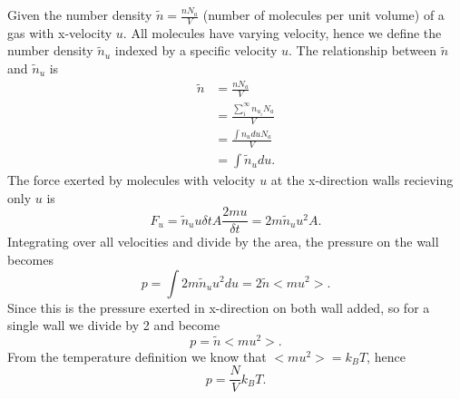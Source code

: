 \begin{derv*} 
Given the number density $\tilde{n} = \frac{n N_a}{V}$ (number of molecules per
unit volume) of a gas with x-velocity $u$. All molecules have varying velocity, hence we define the
number density $\tilde{n}_u$ indexed by a specific velocity $u$. The relationship between
$\tilde{n}$ and $\tilde{n}_u$ is
\begin{equation}
\begin{aligned}
   \tilde{n} & = \frac{n N_a}{V} \\
             & = \frac{\sum_{i}^\infty n_{u_i} N_a}{V} \\
             & = \frac{\int n_{u} du N_a}{V} \\
             & = \int \tilde{n}_u du.
\end{aligned}
\end{equation}
The force exerted by molecules with velocity $u$ at the x-direction walls recieving only $u$ is
\begin{equation}
   F_u = \tilde{n}_u u\delta t A \frac{2m u}{\delta t} = 2m\tilde{n}_u u^2 A.
\end{equation}
Integrating over all velocities and divide by the area, the pressure on the wall becomes
\begin{equation}
   p = \int 2m\tilde{n}_u u^2du = 2 \tilde{n} <m u^2>.
\end{equation}
Since this is the pressure exerted in x-direction on both wall added, so for a single wall we divide
by 2 and become 
\begin{equation}
   p = \tilde{n} <m u^2>.
\end{equation}
From the temperature definition we know that $<m u^2>=k_BT$, hence
\begin{equation}
   p = \frac{N}{V}k_B T.
\end{equation}
\end{derv*}

